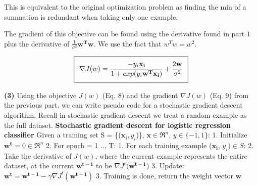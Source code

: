 \documentclass[11pt]{article}
\renewcommand\part[1]{\vspace{.10in}\textbf{(#1)}}
\begin{document}
This is equivalent to the original optimization problem as finding the min of a summation is redundant when taking only one example.

The gradient of this objective can be found using the derivative found in part $1$ plus the derivative of $\frac{1}{\sigma^2}\mathbf{w^Tw}$. We use the fact that $w^Tw = w^2$.

\begin{equation}
\setlength\fboxsep{0.25cm}
\setlength\fboxrule{0.4pt}
\boxed{\nabla J(w) = \frac{-y_i\mathbf{x_i}}{1 + exp(y_i\mathbf{w^Tx_i})} + \frac{2\mathbf{w}}{\sigma^2}}
\end{equation}

\part{3} Using the objective $J(w)$ (Eq. 8) and the gradient $\nabla J(w)$ (Eq. 9) from the previous part, we can write pseudo code for a stochastic gradient descent algorithm. Recall in stochastic gradient descent we treat a random example as the full dataset.
\vspace{2mm} \break
{\Large \textbf{Stochastic gradient descent for logistic regression classifier}} \vspace{2mm} \break
{\large Given a training set S = \{($\mathbf{x_i}, y_i$)\}, $\mathbf{x} \in \Re^n$, $y \in \{-1, 1\}$:} \vspace{2mm} \break
{\large 1. \hspace{5mm} Initialize $\mathbf{w}^0 = 0 \in \Re^n$} \vspace{2mm} \break
{\large 2. \hspace{5mm} For epoch = 1 ... T:} \vspace{2mm} \break
{\large \hspace*{20mm} 1. For each training example ($\mathbf{x_i}$, $y_i) \in S$:} \vspace{2mm} \break
{\large \hspace*{20mm} 2. Take the derivative of $J(w)$, where the current example represents the entire}
{\large \hspace*{25mm} dataset, at the current $\mathbf{w^{t-1}}$ to be $\nabla J^t(\mathbf{w^{t-1})}$} \vspace{2mm} \break
{\large \hspace*{20mm} 3. Update: $\mathbf{w^t} = \mathbf{w^{t-1}} - \gamma \nabla J^t(\mathbf{w^{t-1}})$} \vspace{2mm} \break
{\large 3. Training is done, return the weight vector $\mathbf{w}$}
\end{document}
